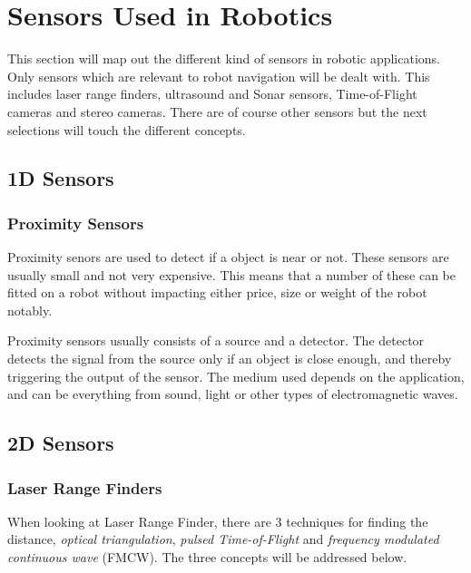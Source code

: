 \section{Sensors Used in Robotics}
This section will map out the different kind of sensors in robotic applications. Only
sensors which are relevant to robot navigation will be dealt with. This includes
laser range finders, ultrasound and Sonar sensors, Time-of-Flight cameras and
stereo cameras. There are of course other sensors but the next selections will touch the
different concepts. 


\subsection{1D Sensors}

\subsubsection{Proximity Sensors}
Proximity senors are used to detect if a object is near or not. These sensors are usually
small and not very expensive. This means that a number of these can be fitted on a robot
without impacting either price, size or weight of the robot notably.  

Proximity sensors usually consists of a source and a detector. The detector detects the
signal from the source only if an object is close enough, and thereby triggering the
output of the sensor. The medium used depends on the application, and can be everything
from sound, light or other types of electromagnetic waves. \cite{proximity}

\subsection{2D Sensors}

\subsubsection{Laser Range Finders}
When looking at Laser Range Finder, there are 3 techniques for finding the distance,
\emph{optical triangulation}, \emph{pulsed Time-of-Flight} and \emph{frequency modulated
continuous wave} (FMCW). The three concepts will be addressed below. \cite{laser-ranging-critical-review}

